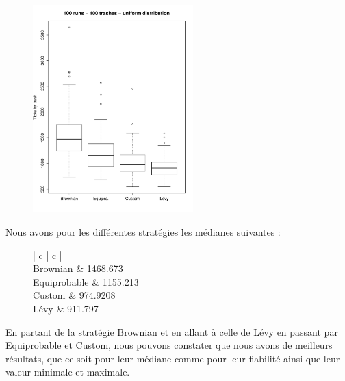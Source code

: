 
\begin{figure}[H]
	\begin{center}
		\includegraphics[height=8cm]{diagrams/100TrRnd_all.pdf}
		\caption{}
		\label{fig:100Trashes_Rnd}
	\end{center}
\end{figure}

Nous avons pour les différentes stratégies les médianes suivantes :

\begin{figure}[H]
	\begin{center}
		\begin{tabular}{ | c | c | }
			\hline
			 \\
			\hline
			Brownian & 1468.673 \\
			Equiprobable & 1155.213 \\
			Custom & 974.9208 \\
			Lévy & 911.797 \\
			\hline
		\end{tabular}
	\end{center}
\end{figure}

En partant de la stratégie Brownian et en allant à celle de Lévy
en passant par Equiprobable et Custom, nous pouvons constater
que nous avons de meilleurs résultats, que ce soit pour leur médiane
comme pour leur fiabilité ainsi que leur valeur minimale et maximale.

